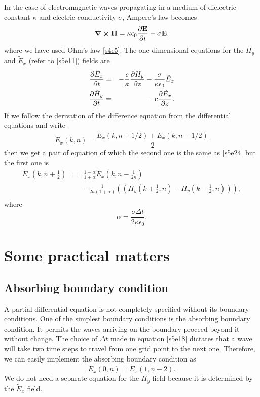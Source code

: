 \documentclass[11pt]{article}
\numberwithin{equation}{section}
\begin{document}
In the case of electromagnetic waves propagating in a medium of dielectric
constant $\kappa$ and electric conductivity $\sigma$, Ampere's law becomes
\begin{equation}\label{s5e25}
\curl\vb{H} = \kappa\epsilon_0\pdv{\vb{E}}{t} - \sigma\vb{E},
\end{equation}
where we have used Ohm's law \eqref{s4e5}. The one dimensional equations
for the $H_y$ and $\tilde{E}_x$ (refer to \eqref{s5e11}) fields are
\begin{eqnarray}
\pdv{\tilde{E}_x}{t} &=& -\frac{c}{\kappa}\pdv{H_y}{z} - 
\frac{\sigma}{\kappa\epsilon_0}\tilde{E}_x \label{s5e26} \\
\pdv{\tilde{H}_y}{t} &=& -c\pdv{\tilde{E}_x}{z}. \label{s5e27}
\end{eqnarray}
If we follow the derivation of the difference equation from the differential
equations and write 
\[
\tilde{E}_x(k, n) = \frac{\tilde{E}_x(k, n + 1/2) + \tilde{E}_x(k, n - 1/2)}{2}
\]
then we get a pair of equation of which the second one is the same as 
\eqref{s5e24} but the first one is
\begin{eqnarray}
\tilde{E}_x\left(k ,n+\frac{1}{2}\right) &=& \frac{1-\alpha}{1+\alpha}
\tilde{E}_x\left(k , n-\frac{1}{2\kappa}\right) \nonumber \\
 & & -\frac{1}{2\kappa(1 + \alpha)}\left(\left(
H_y\left(k + \frac{1}{2}, n\right) - H_y\left(k - \frac{1}{2}, n\right)\right)
\right), \nonumber \\
 & & \label{s5e28}
\end{eqnarray}
where \cite{sullivan2013electromagnetic}
\begin{equation}\label{s5e29}
\alpha = \frac{\sigma\Delta t}{2\kappa\epsilon_0}.
\end{equation}

\section{Some practical matters}\label{s6}
\subsection{Absorbing boundary condition}
A partial differential equation is not completely specified without its
boundary conditions. One of the simplest boundary conditions is the 
absorbing boundary condition. It permits the waves arriving on the boundary
proceed beyond it without change. The choice of $\Delta t$ made in equation
\eqref{s5e18} dictates that a wave will take two time steps to travel from
one grid point to the next one. Therefore, we can easily implement the
absorbing boundary condition as
\begin{equation}\label{s6e1}
\tilde{E}_x(0, n) = \tilde{E}_x(1, n-2).
\end{equation}
We do not need a separate equation for the $H_y$ field because it is 
determined by the $\tilde{E}_x$ field.
\end{document}
